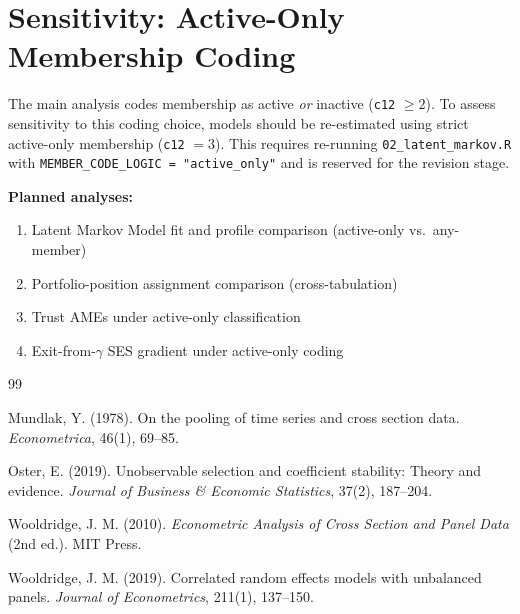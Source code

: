 \documentclass[12pt, a4paper]{article}
\begin{document}
\section{Sensitivity: Active-Only Membership Coding}
\label{sec:active}

The main analysis codes membership as active \emph{or} inactive
(\texttt{c12} $\geq 2$). To assess sensitivity to this coding choice, models
should be re-estimated using strict active-only membership (\texttt{c12} $= 3$).
This requires re-running \texttt{02\_latent\_markov.R} with
\texttt{MEMBER\_CODE\_LOGIC = "active\_only"} and is reserved for the
revision stage.

\noindent\textbf{Planned analyses:}
\begin{enumerate}
  \item Latent Markov Model fit and profile comparison (active-only vs.\ any-member)
  \item Portfolio-position assignment comparison (cross-tabulation)
  \item Trust AMEs under active-only classification
  \item Exit-from-$\gamma$ SES gradient under active-only coding
\end{enumerate}

\newpage

\begin{thebibliography}{99}

Mundlak, Y. (1978). On the pooling of time series and cross section data.
\textit{Econometrica}, 46(1), 69--85.

Oster, E. (2019). Unobservable selection and coefficient stability: Theory
and evidence. \textit{Journal of Business \& Economic Statistics}, 37(2),
187--204.

Wooldridge, J. M. (2010). \textit{Econometric Analysis of Cross Section and
Panel Data} (2nd ed.). MIT Press.

Wooldridge, J. M. (2019). Correlated random effects models with unbalanced
panels. \textit{Journal of Econometrics}, 211(1), 137--150.

\end{thebibliography}
\end{document}
